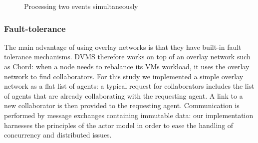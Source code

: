 \begin{figure}[h]
%
%
%
%
\caption{Processing two events simultaneously\label{fig:dvms_pte}}
\end{figure}


\subsubsection{Fault-tolerance}

The main advantage of using overlay networks is that they have
built-in fault tolerance mechanisms. DVMS therefore works on top of an
overlay network such as Chord: when a node needs to rebalance its VMs
workload, it uses the overlay network to find collaborators. For this
study we implemented a simple overlay network as a flat list of
agents: a typical request for collaborators includes the list of
agents that are already collaborating with the requesting agent. A
link to a new collaborator is then provided to the requesting
agent. Communication is performed by message exchanges containing
immutable data: our implementation harnesses the principles of the
actor model in order to ease the handling of concurrency and
distributed issues.

